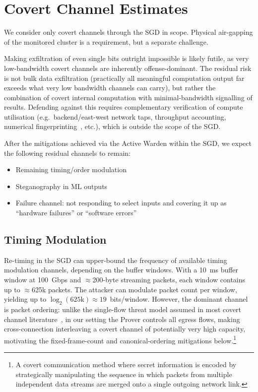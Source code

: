 \documentclass{article}
\begin{document}
\section{Covert Channel Estimates}
\label{sec:covert}

We consider only covert channels through the SGD in scope. Physical air-gapping of the monitored cluster is a requirement, but a separate challenge.

Making exfiltration of even single bits outright impossible is likely futile, as very low-bandwidth covert channels are inherently offense-dominant. The residual risk is not bulk data exfiltration (practically all meaningful computation output far exceeds what very low bandwidth channels can carry), but rather the combination of covert internal computation with minimal-bandwidth signalling of results. Defending against this requires complementary verification of compute utilisation (e.g.\ backend/east-west network taps, throughput accounting, numerical fingerprinting~\cite{cankaya2025catching1}, etc.), which is outside the scope of the SGD.

After the mitigations achieved via the Active Warden within the SGD, we expect the following residual channels to remain:
\begin{itemize}
\item Remaining timing/order modulation
\item Steganography in ML outputs
\item Failure channel: not responding to select inputs and covering it up as ``hardware failures'' or ``software errors''
\end{itemize}

\subsection{Timing Modulation}

Re-timing in the SGD can upper-bound the frequency of available timing modulation channels, depending on the buffer windows. With a 10~ms buffer window at 100~Gbps and $\approx$200-byte streaming packets, each window contains up to $\approx$625k packets. The attacker can modulate packet count per window, yielding up to $\log_2(625\text{k}) \approx 19$~bits/window. However, the dominant channel is packet ordering: unlike the single-flow threat model assumed in most covert channel literature~\cite{uttarwar2025delay,xing2020netwarden,park2023airgap}, in our setting the Prover controls all egress flows, making cross-connection interleaving a covert channel of potentially very high capacity, motivating the fixed-frame-count and canonical-ordering mitigations below.\footnote{A covert communication method where secret information is encoded by strategically manipulating the sequence in which packets from multiple independent data streams are merged onto a single outgoing network link.}
\end{document}
